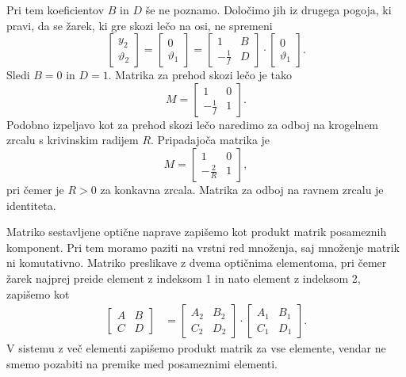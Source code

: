 Pri tem koeficientov $B$ in $D$ še ne poznamo. Določimo jih iz drugega pogoja, 
ki pravi, da se žarek, ki gre skozi lečo na osi, ne spremeni
\begin{equation}
\left[\begin{array}{c}
y_{2}\\
\vartheta_{2}
\end{array}\right]=\left[\begin{array}{c}
0\\
\vartheta_{1}
\end{array}\right]=\left[\begin{array}{cc}
1 & B\\
-\frac{1}{f} & D
\end{array}\right]\cdot\left[\begin{array}{c}
0\\
\vartheta_{1}
\end{array}\right].
\end{equation}
 Sledi $B=0$ in $D=1$. Matrika za prehod skozi lečo je tako 
\begin{equation}
M= \left[\begin{array}{cc}
1 & 0\\
-\frac{1}{f} & 1
\end{array}\right].
\label{eq:MABCD2}
\end{equation}
Podobno izpeljavo kot za prehod skozi lečo naredimo za odboj na krogelnem zrcalu
s krivinskim radijem $R$. Pripadajoča matrika je 
\begin{equation}
M=\left[\begin{array}{cc}
1 & 0\\
-\frac{2}{R} & 1
\end{array}\right],
\end{equation}
pri čemer je $R>0$ za konkavna zrcala. Matrika za odboj na ravnem zrcalu je identiteta.

Matriko sestavljene optične naprave zapišemo kot produkt matrik posameznih komponent. 
Pri tem moramo paziti na vrstni red množenja, saj množenje matrik ni komutativno.
Matriko preslikave z dvema optičnima elementoma, pri čemer žarek 
najprej preide element z indeksom 1 in nato element z indeksom 2, zapišemo kot 
\begin{align}
\left[\begin{array}{cc}
A & B\\
C & D
\end{array}\right] & =  \left[\begin{array}{cc}
A_{2} & B_{2}\\
C_{2} & D_{2}
\end{array}\right]\cdot\left[\begin{array}{cc}
A_{1} & B_{1}\\
C_{1} & D_{1}
\end{array}\right].
\end{align}
V sistemu z več elementi zapišemo produkt matrik za vse elemente, 
vendar ne smemo pozabiti na premike med posameznimi elementi.

